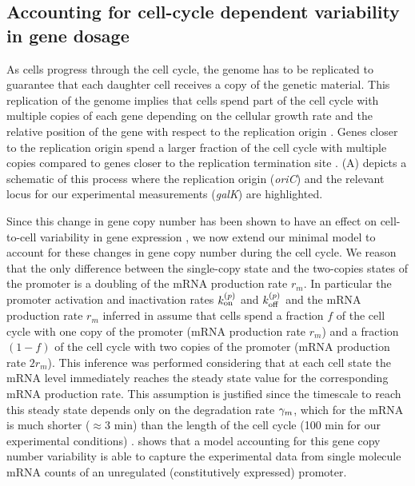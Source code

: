 \subsection{Accounting for cell-cycle dependent variability in gene dosage}
\label{sec_cell_cycle}

As cells progress through the cell cycle, the genome has to be replicated to
guarantee that each daughter cell receives a copy of the genetic material. This
replication of the genome implies that cells spend part of the cell cycle with
multiple copies of each gene depending on the cellular growth rate and the
relative position of the gene with respect to the replication origin
\cite{Bremer1996}. Genes closer to the replication origin spend a larger
fraction of the cell cycle with multiple copies compared to genes closer to the
replication termination site \cite{Bremer1996}. (A)
depicts a schematic of this process where the replication origin ({\it oriC})
and the relevant locus for our experimental measurements ({\it galK}) are
highlighted.

Since this change in gene copy number has been shown to have an effect on
cell-to-cell variability in gene expression \cite{Jones2014a, Peterson2015}, we
now extend our minimal model to account for these changes in gene copy number
during the cell cycle.  We reason that the only difference between the
single-copy state and the two-copies states of the promoter is a doubling of
the mRNA production rate $r_m$. In particular the promoter activation and
inactivation rates $k^{(p)}_{\text{on}}$ and $k^{(p)}_{\text{off}}$ and the mRNA production rate $r_m$
inferred in  assume that cells spend a fraction $f$ of the
cell cycle  with one copy of the promoter (mRNA production rate $r_m$) and a
fraction $(1-f)$ of the cell cycle with two copies of the promoter (mRNA
production rate $2 r_m$). This inference was performed considering that at each
cell state the mRNA level immediately reaches the steady state value for the
corresponding mRNA production rate. This assumption is justified since the
timescale to reach this steady state depends only on the degradation rate
$\gamma _m$, which for the mRNA  is much shorter ($\approx 3$ min) than the length
of the cell cycle (100 min for our experimental conditions) \cite{Dong1995}.
 shows that a model accounting for this gene copy
number variability is able to capture the experimental data from single
molecule mRNA counts of an unregulated (constitutively expressed) promoter.

